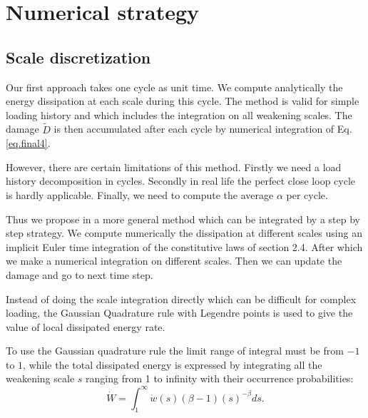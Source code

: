\documentclass[3p,times,number,review]{elsarticle}
\begin{document}
\newpage
\section{Numerical strategy}
\label{sec:5.7}
\subsection{Scale discretization}
Our first approach takes one cycle as unit time. We compute analytically the energy dissipation at each scale during this cycle. The method is valid for simple loading history and which includes the integration on all weakening scales. The damage $\tilde{D}$ is then accumulated after each cycle by numerical integration of Eq.\eqref{eq.final4}.

However, there are certain limitations of this method. Firstly we need a load history decomposition in cycles. Secondly in real life the perfect close loop cycle is hardly applicable. Finally, we need to compute the average $\alpha$ per cycle.

Thus we propose in a more general method which can be integrated by a step by step strategy. We compute numerically the dissipation at different scales using an implicit Euler time integration of the constitutive laws of section 2.4. After which we make a numerical integration on different scales. Then we can update the damage and go to next time step. 

Instead of doing the scale integration directly which can be difficult for complex loading, the Gaussian Quadrature rule with Legendre points is used to give the value of local dissipated energy rate.

To use the Gaussian quadrature rule the limit range of integral must be from $-1$ to $1$, while the total dissipated energy  is expressed by integrating all the weakening scale $s$ ranging from 1 to infinity with their occurrence probabilities:
$$\dot{W}=\int_{1}^{\infty}\dot{w}(s) (\beta-1)(s)^{-\beta}ds.$$
\end{document}
